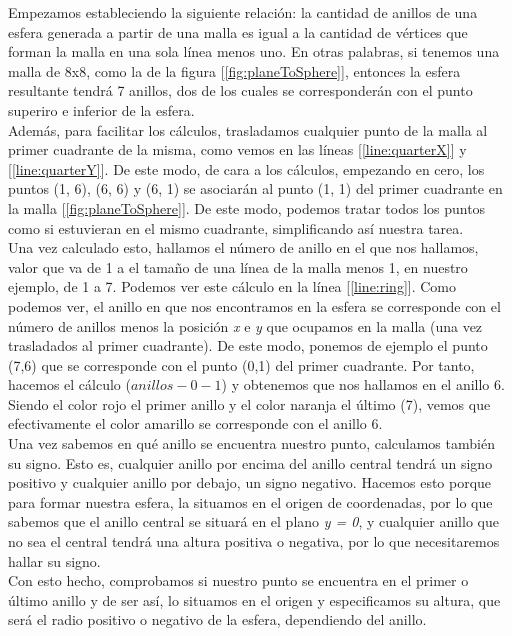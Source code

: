 Empezamos estableciendo la siguiente relación: la cantidad de anillos de una esfera generada a partir de una malla es igual a la cantidad de vértices que forman la malla en una sola línea menos uno. En otras palabras, si tenemos una malla de 8x8, como la de la figura [\ref{fig:planeToSphere}], entonces la esfera resultante tendrá 7 anillos, dos de los cuales se corresponderán con el punto superiro e inferior de la esfera.\\

Además, para facilitar los cálculos, trasladamos cualquier punto de la malla al primer cuadrante de la misma, como vemos en las líneas [\ref{line:quarterX}] y [\ref{line:quarterY}]. De este modo, de cara a los cálculos, empezando en cero, los puntos (1, 6), (6, 6) y (6, 1) se asociarán al punto (1, 1) del primer cuadrante en la malla [\ref{fig:planeToSphere}]. De este modo, podemos tratar todos los puntos como si estuvieran en el mismo cuadrante, simplificando así nuestra tarea.\\

Una vez calculado esto, hallamos el número de anillo en el que nos hallamos, valor que va de 1 a el tamaño de una línea de la malla menos 1, en nuestro ejemplo, de 1 a 7. Podemos ver este cálculo en la línea [\ref{line:ring}]. Como podemos ver, el anillo en que nos encontramos en la esfera se corresponde con el número de anillos menos la posición \emph{x} e \emph{y} que ocupamos en la malla (una vez trasladados al primer cuadrante). De este modo, ponemos de ejemplo el punto (7,6) que se corresponde con el punto (0,1) del primer cuadrante. Por tanto, hacemos el cálculo (\(anillos - 0 - 1\)) y obtenemos que nos hallamos en el anillo 6. Siendo el color rojo el primer anillo y el color naranja el último (7), vemos que efectivamente el color amarillo se corresponde con el anillo 6.\\

Una vez sabemos en qué anillo se encuentra nuestro punto, calculamos también su signo. Esto es, cualquier anillo por encima del anillo central tendrá un signo positivo y cualquier anillo por debajo, un signo negativo. Hacemos esto porque para formar nuestra esfera, la situamos en el origen de coordenadas, por lo que sabemos que el anillo central se situará en el plano \emph{y = 0}, y cualquier anillo que no sea el central tendrá una altura positiva o negativa, por lo que necesitaremos hallar su signo.\\

Con esto hecho, comprobamos si nuestro punto se encuentra en el primer o último anillo y de ser así, lo situamos en el origen y especificamos su altura, que será el radio positivo o negativo de la esfera, dependiendo del anillo.\\

